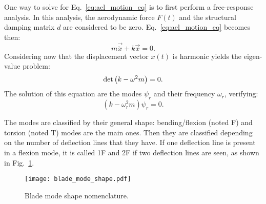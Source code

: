 
One way to solve for Eq.~\eqref{eq:ael_motion_eq}
is to first perform a free-response analysis.
In this analysis, the aerodynamic force $F(t)$ and
the structural damping matrix $d$ are considered to be zero.
Eq.~\eqref{eq:ael_motion_eq} becomes then:
\begin{equation}
	m \vec{\ddot{x}} + k \vec{x} = 0.
	\label{eq:ael_motion_eq_free_response}
\end{equation}
Considering now that the displacement vector $x(t)$ is harmonic
yields the eigen-value problem:
\begin{equation}
	\mdet \left(k - \omega^2 m  \right) = 0.
	\label{eq:ael_motion_eq_eigen_value}
\end{equation}
The solution of this equation are the modes $\psi_r$
and their frequency $\omega_r$, verifying:
\begin{equation}
	\left(k - \omega_r^2 m  \right) \psi_r = 0.
\end{equation}

The modes are classified by their general shape: 
bending/flexion (noted F) and torsion (noted T) 
modes are the main ones. Then they are classified
depending on the number of deflection lines that they
have. If one deflection line is present in a flexion 
mode, it is called 1F and 2F if two deflection lines are
seen, as shown in Fig.~\ref{fig:blade_mode_shape}.
\begin{figure}[htbp]
  \centering
  \texttt{[image: blade\_mode\_shape.pdf]}
  \caption{Blade mode shape nomenclature.}
  \label{fig:blade_mode_shape}
\end{figure}
